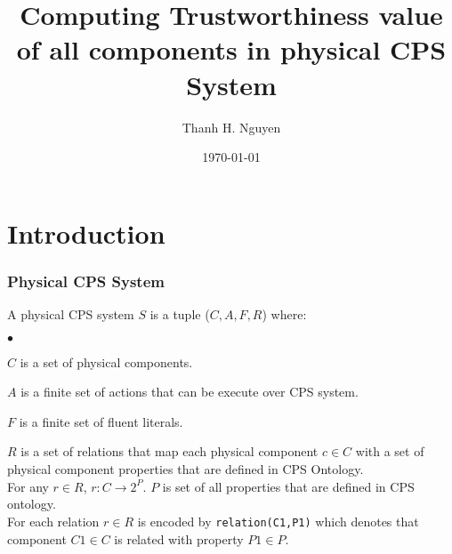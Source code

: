 \documentclass{beamer}
\title[Truthworthiness value]{Computing Trustworthiness value of all components in physical CPS System} %
\author{Thanh H. Nguyen} %
\institute[NMSU] %
{
New Mexico State University \\ %
\medskip
\textit{tnguyen@cs.nmsu.edu} %
}
\date{\today} %
\begin{document}
\begin{frame}
\titlepage %
\end{frame}




\section{Introduction} 

\begin{frame}
	\frametitle{Physical CPS System}
	\begin{definition}
		\label{def:physical_CPS_system} 
		A physical CPS system $S$ is a tuple ($C, A, F, R$) where:
		\begin{list}{$\bullet$}{\itemsep=0pt \parsep=1pt \topsep=1pt \leftmargin=12pt} 
			\item $C$ is a set of physical components.
			\item $A$ is a finite set of actions that can be execute over CPS system.
			\item $F$ is a finite set of fluent literals.
			\item $R$ is a set of relations that map each physical component $c \in C$ with a set of physical component properties that are defined in CPS Ontology.  \\
			For any $r \in R$, $r : C \longrightarrow 2^{P}$. $P$ is set of all properties that are defined in CPS ontology. \\
			For each relation $r \in R$ is encoded by {\tt relation(C1,P1)} which denotes that component $C1 \in C$ is related with property $P1 \in P$.
		\end{list}
	\end{definition}
\end{frame}
\end{document}
